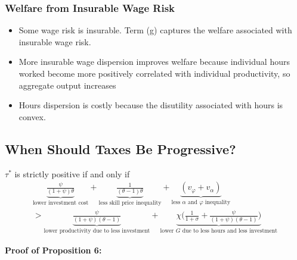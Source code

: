 \documentclass{article}
\newenvironment{customthm}[1]
  {\renewcommand\theinnercustomthm{#1}\innercustomthm}
  {\endinnercustomthm}
\begin{document}
\subsubsection{Welfare from Insurable Wage Risk}

\begin{itemize}
\item Some wage risk is insurable. Term (g) captures the welfare associated with insurable wage risk.
\item More insurable wage dispersion improves welfare because individual hours worked become more positively correlated with individual productivity, so aggregate output increases 
\item Hours dispersion is costly because the disutility associated with hours is convex.
\end{itemize}

\subsection{When Should Taxes Be Progressive?}

\begin{customthm}{6}\label{prop6}
$\tau^*$ is strictly positive if and only if 
\begin{align}
\underbrace{
\frac{\psi}{(1+\psi)\theta}
}_
{\text{lower investment cost}}
+ 
\underbrace{
\frac{1}{(\theta -1 )\theta} 
}_
{\text{less skill price inequality}}
+ 
\underbrace{
(v_\varphi + v_\alpha)
}_
{\text{less $\alpha$ and $\varphi$ inequality}} \nonumber \\
> 
\underbrace{
\frac{\psi}{(1+\psi)(\theta-1)} 
}_
{\text{lower productivity due to less investment}}
+ 
\underbrace{
\chi \Bigg(\frac{1}{1+\sigma} + \frac{\psi}{(1+\psi)(\theta -1)}\Bigg)
}_
{\text{lower $G$ due to less hours and less investment}}
\end{align}
\end{customthm}

\bigskip

\textbf{Proof of Proposition 6:}
\end{document}
